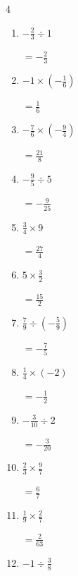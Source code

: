 \begin{multicols}{4}
\begin{enumerate}
        $\displaystyle =\frac{7}{10}$

  \item $\displaystyle -\frac{2}{3}\div{}1$

        $\displaystyle =-\frac{2}{3}$

\columnbreak %

  \item $\displaystyle -1\times{}\left(-\frac{1}{6}\right)$

        $\displaystyle =\frac{1}{6}$

  \item $\displaystyle -\frac{7}{6}\times{}\left(-\frac{9}{4}\right)$

        $\displaystyle =\frac{21}{8}$

  \item $\displaystyle -\frac{9}{5}\div{}5$

        $\displaystyle =-\frac{9}{25}$

  \item $\displaystyle \frac{3}{4}\times{}9$

        $\displaystyle =\frac{27}{4}$

  \item $\displaystyle 5\times{}\frac{3}{2}$

        $\displaystyle =\frac{15}{2}$

  \item $\displaystyle \frac{7}{9}\div{}\left(-\frac{5}{9}\right)$

        $\displaystyle =-\frac{7}{5}$

  \item $\displaystyle \frac{1}{4}\times{}\left(-2\right)$

        $\displaystyle =-\frac{1}{2}$

  \item $\displaystyle -\frac{3}{10}\div{}2$

        $\displaystyle =-\frac{3}{20}$

  \item $\displaystyle \frac{2}{3}\times{}\frac{9}{7}$

        $\displaystyle =\frac{6}{7}$

  \item $\displaystyle \frac{1}{9}\times{}\frac{2}{7}$

        $\displaystyle =\frac{2}{63}$

\columnbreak %

  \item $\displaystyle -1\div{}\frac{3}{8}$


\end{enumerate}
\end{multicols}
